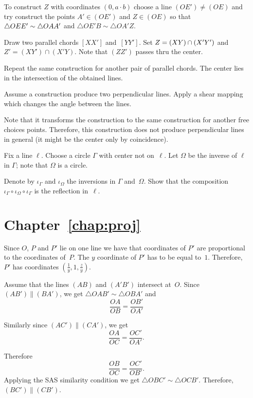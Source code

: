 To construct $Z$ with coordinates $(0,a\cdot b)$
choose a line $(OE')\ne (OE)$
and try construct the points $A'\in (OE')$
and $Z \in(OE)$
so that 
$\triangle OEE'\z\sim \triangle OAA'$ and $\triangle OE'B\sim \triangle OA'Z$.

Draw two parallel chords $[XX']$ and~$[YY']$.
Set $Z\z=(XY)\cap (X'Y')$ and $Z'= (XY')\cap (X'Y)$.
Note that $(ZZ')$ passes thru the center.

Repeat the same construction for another pair of parallel chords.
The center lies in the intersection of the obtained lines.

Assume a construction produce  two perpendicular lines.
Apply a shear mapping which changes the angle between the lines.

Note that it transforms the construction to the same construction for another free choices points.
Therefore, this construction does not produce perpendicular lines in general
 (it might be the center only by coincidence).
 
Fix a line $\ell$.
Choose a circle $\Gamma$ with center not on~$\ell$.
Let $\Omega$ be the inverse of $\ell$ in $\Gamma$;
note that $\Omega$ is a circle.

Denote by $\iota_\Gamma$ and $\iota_\Omega$ 
the inversions in $\Gamma$ and~$\Omega$.
Show that the composition 
$\iota_\Gamma\circ\iota_\Omega\circ\iota_\Gamma$
is the reflection in~$\ell$.


\section*{Chapter~\ref{chap:proj}}
\setcounter{eqtn}{0}

Since $O$, $P$ and $P'$ lie on one line we have
that coordinates of $P'$ are proportional to the coordinates of~$P$.
The $y$ coordinate of $P'$ has to be equal to~$1$.
Therefore, $P'$ has coordinates 
$(\tfrac1y,1,\tfrac zy)$.


Assume that the lines $(AB)$ and $(A'B')$ intersect at~$O$.
Since $(AB')\parallel (BA')$, we get $\triangle OAB'\sim\triangle OBA'$
and
\[\frac{OA}{OB}=\frac{OB'}{OA'}\]

Similarly since $(AC')\parallel (CA')$, 
we get 
\[\frac{OA}{OC}=\frac{OC'}{OA'}.\]

Therefore
\[\frac{OB}{OC}=\frac{OC'}{OB'}.\]
Applying the SAS similarity condition we get
$\triangle OBC'\sim\triangle OCB'$.
Therefore, $(BC')\parallel (CB')$.

